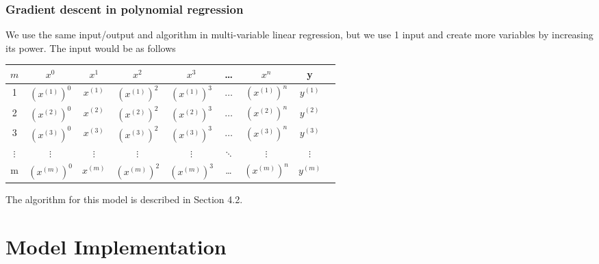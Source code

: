 \subsubsection{Gradient descent in polynomial regression}
We use the same input/output and algorithm in multi-variable linear regression, but we use 1 input and create more variables by increasing its power. The input would be as follows  
\begin{center}
\begin{tabular}{ |c|c|c|c|c|c|c|c|c| } 
\hline
$m$ & $x^0$ & $x^1$ & $x^2$ & $x^3$ & \dots & $x^n$ & y \\
\hline
1 & $(x^{(1)})^0$ & $x^{(1)}$ & $(x^{(1)})^2$ & $(x^{(1)})^3$ & $\dots$ & $(x^{(1)})^n$ & $y^{(1)}$\\ 
2 & $(x^{(2)})^0$ & $x^{(2)}$ & $(x^{(2)})^2$ & $(x^{(2)})^3$ & $\dots$ & $(x^{(2)})^n$ & $y^{(2)}$\\
3 & $(x^{(3)})^0$ & $x^{(3)}$ & $(x^{(3)})^2$ & $(x^{(3)})^3$ & $\dots$ & $(x^{(3)})^n$ & $y^{(3)}$\\
$\vdots$ & $\vdots$ & $\vdots$ & $\vdots$ & $\vdots$ & $\ddots$ & $\vdots$ & $\vdots$\\ 
m & $(x^{(m)})^0$ & $x^{(m)}$ & $(x^{(m)})^2$ & $(x^{(m)})^3$ & \dots & $(x^{(m)})^n$ & $y^{(m)}$\\ 
\hline
\end{tabular}
\end{center}
The algorithm for this model is described in Section 4.2.


\newpage


\section{Model Implementation}
